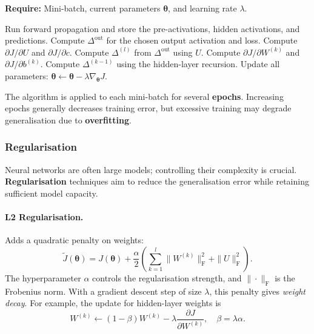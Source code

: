 \begin{algorithm}[H]
    \caption{Backward Propagation}
    \textbf{Require:} Mini-batch, current parameters $\bm{\theta}$, and learning rate $\lambda$.\\
    \begin{algorithmic}[1]
        \State Run forward propagation and store the pre-activations, hidden activations, and predictions.
        \State Compute $\Delta^{\mathrm{out}}$ for the chosen output activation and loss.
        \State Compute $\partial J/\partial U$ and $\partial J/\partial c$.
        \State Compute $\Delta^{(l)}$ from $\Delta^{\mathrm{out}}$ using $U$.
            \State Compute $\partial J/\partial W^{(k)}$ and $\partial J/\partial b^{(k)}$.
                \State Compute $\Delta^{(k-1)}$ using the hidden-layer recursion.
            \EndIf
        \EndFor
        \State Update all parameters: $\bm{\theta}\gets\bm{\theta}-\lambda\nabla_{\bm{\theta}}J$.
    \end{algorithmic}
\end{algorithm}

\begin{remark}
	The algorithm is applied to each mini-batch for several \textbf{epochs}. Increasing epochs generally decreases training error, but excessive training may degrade generalisation due to \textbf{overfitting}.
\end{remark}

\subsubsection{Regularisation}

Neural networks are often large models; controlling their complexity is crucial. \textbf{Regularisation} techniques aim to reduce the generalisation error while retaining sufficient model capacity.

\paragraph{L2 Regularisation.} Adds a quadratic penalty on weights:
\[
\tilde{J}(\bm{\theta}) = J(\bm{\theta}) + \frac{\alpha}{2}
\left(\sum_{k=1}^l\|W^{(k)}\|_{\mathrm{F}}^2+\|U\|_{\mathrm{F}}^2\right).
\]
The hyperparameter $\alpha$ controls the regularisation strength, and $\|\cdot\|_{\mathrm{F}}$ is the Frobenius norm. With a gradient descent step of size $\lambda$, this penalty gives \textit{weight decay}. For example, the update for hidden-layer weights is
\[
W^{(k)} \gets (1-\beta)W^{(k)} - \lambda \frac{\partial J}{\partial W^{(k)}}, \quad \beta = \lambda \alpha.
\]


